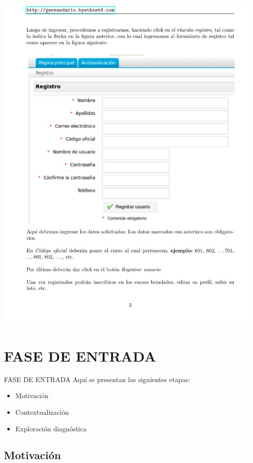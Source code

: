 \documentclass{beamer}
\begin{document}
\begin{frame}
\begin{center}
\includegraphics[scale=.375,trim=1cm 2.25cm 1cm 1.7cm,clip]{Images/GuiaIngresPlataforma2.pdf}
\end{center}
\end{frame}
\section{FASE DE ENTRADA}
\begin{frame}{FASE DE ENTRADA}
Aquí se presentan las siguientes etapas:
\begin{itemize}
  \item Motivación\pause
  \item Contextualización \pause
  \item Exploración diagnóstica
\end{itemize}
\end{frame}

\subsection[Motivación]{Motivación}
\end{document}
